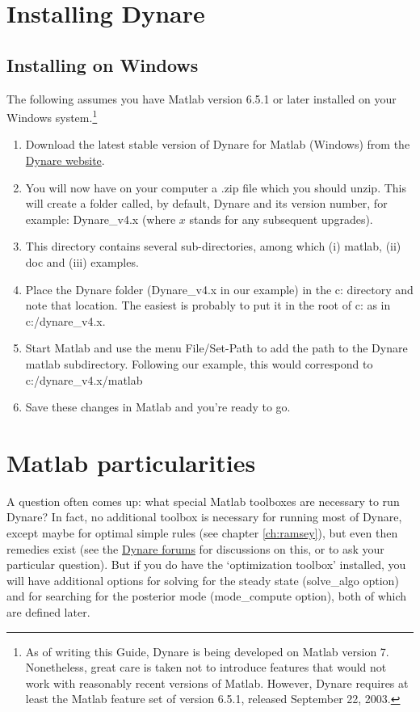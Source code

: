 \section{Installing Dynare}
\subsection{Installing on Windows}
The following assumes you have Matlab version 6.5.1 or later installed on your Windows system.\footnote{As of writing this Guide, Dynare is being developed on Matlab version 7. Nonetheless, great care is taken not to introduce features that would not work with reasonably recent versions of Matlab. However, Dynare requires at least the Matlab feature set of version 6.5.1, released September 22, 2003.}
\begin{enumerate}
\item Download the latest stable version of Dynare for Matlab (Windows) from the \href{http://www.cepremap.cnrs.fr/juillard/mambo/index.php?option=com_frontpage&Itemid=1}{Dynare website}. 
\item You will now have on your computer a .zip file which you should unzip. This will create a folder called, by default, Dynare and its version number, for example: Dynare\_v4.x (where $x$ stands for any subsequent upgrades). 
\item This directory contains several sub-directories, among which (i) matlab, (ii) doc and (iii) examples. 
\item Place the Dynare folder (Dynare\_v4.x in our example) in the c: directory and note that location. The easiest is probably to put it in the root of c: as in c:/dynare\_v4.x.
\item Start Matlab and use the menu File/Set-Path to add the path to the Dynare 
matlab subdirectory. Following our example, this would correspond to 
c:/dynare\_v4.x/matlab
\item Save these changes in Matlab and you're ready to go.
\end{enumerate} 


\section{Matlab particularities}

A question often comes up: what special Matlab toolboxes are necessary to run Dynare? In fact, no additional toolbox is necessary for running most of Dynare, except maybe for optimal simple rules (see chapter \ref{ch:ramsey}), but even then remedies exist (see the \href{http://www.cepremap.cnrs.fr/juillard/mambo/index.php?option=com_forum&Itemid=95}{Dynare forums} for discussions on this, or to ask your particular question). But if you do have the `optimization toolbox' installed, you will have additional options for solving for the steady state (solve\_algo option) and for searching for the posterior mode (mode\_compute option), both of which are defined later. 


